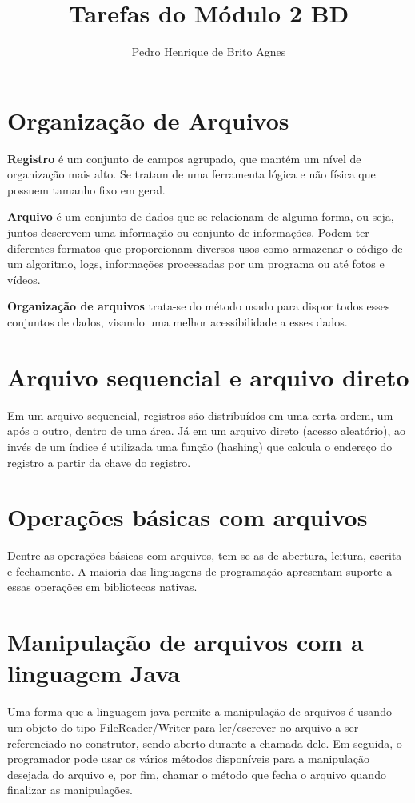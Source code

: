 \documentclass[12pt]{article}
\begin{document}
\title{Tarefas do Módulo 2 BD}
\author{Pedro Henrique de Brito Agnes}

\maketitle

\section{Organização de Arquivos}
\textbf{Registro} é um conjunto de campos agrupado, que mantém um nível de organização mais alto. Se tratam de uma ferramenta lógica e não física que possuem tamanho fixo em geral. 

\noindent
\textbf{Arquivo} é um conjunto de dados que se relacionam de alguma forma, ou seja, juntos descrevem uma informação ou conjunto de informações. Podem ter diferentes formatos que proporcionam diversos usos como armazenar o código de um algoritmo, logs, informações processadas por um programa ou até fotos e vídeos.

\noindent
\textbf{Organização de arquivos} trata-se do método usado para dispor todos esses conjuntos de dados, visando uma melhor acessibilidade a esses dados.

\section{Arquivo sequencial e arquivo direto}
Em um arquivo sequencial, registros são distribuídos em uma certa ordem, um após o outro, dentro de uma área.
Já em um arquivo direto (acesso aleatório), ao invés de um índice é utilizada uma função (hashing) que calcula o endereço do registro a partir da chave do registro.

\section{Operações básicas com arquivos}
Dentre as operações básicas com arquivos, tem-se as de abertura, leitura, escrita e fechamento. A maioria das linguagens de programação apresentam suporte a essas operações em bibliotecas nativas.

\section{Manipulação de arquivos com a linguagem Java}
Uma forma que a linguagem java permite a manipulação de arquivos é usando um objeto do tipo FileReader/Writer para ler/escrever no arquivo a ser referenciado no construtor, sendo aberto durante a chamada dele.
Em seguida, o programador pode usar os vários métodos disponíveis para a manipulação desejada do arquivo e, por fim, chamar o método que fecha o arquivo quando finalizar as manipulações.
\end{document}
